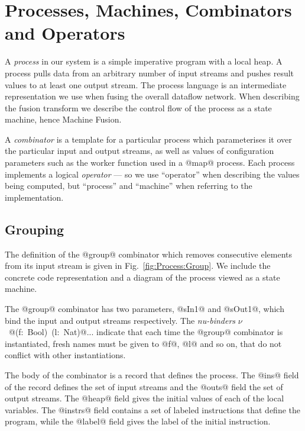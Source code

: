 
\section{Processes, Machines, Combinators and Operators}
\label{s:Processes}

A \emph{process} in our system is a simple imperative program with a local heap. A process pulls data from an arbitrary number of input streams and pushes result values to at least one output stream. The process language is an intermediate representation we use when fusing the overall dataflow network. When describing the fusion transform we describe the control flow of the process as a state machine, hence Machine Fusion. 

A \emph{combinator} is a template for a particular process which parameterises it over the particular input and output streams, as well as values of configuration parameters such as the worker function used in a @map@ process. Each process implements a logical \emph{operator} --- so we use ``operator'' when describing the values being computed, but ``process'' and ``machine'' when referring to the implementation. 


\subsection{Grouping}

The definition of the @group@ combinator which removes consecutive elements from its input stream is given in Fig.~\ref{fig:Process:Group}. We include the concrete code representation and a diagram of the process viewed as a state machine.

The @group@ combinator has two parameters, @sIn1@ and @sOut1@, which bind the input and output streams respectively. The \emph{nu-binders} \mbox{$\nu$ @(f: Bool) (l: Nat)@...} indicate that each time the @group@ combinator is instantiated, fresh names must be given to @f@, @l@ and so on, that do not conflict with other instantiations. 

The body of the combinator is a record that defines the process. The @ins@ field of the record defines the set of input streams and the @outs@ field the set of output streams. The @heap@ field gives the initial values of each of the local variables. The @instrs@ field contains a set of labeled instructions that define the program, while the @label@ field gives the label of the initial instruction. 

